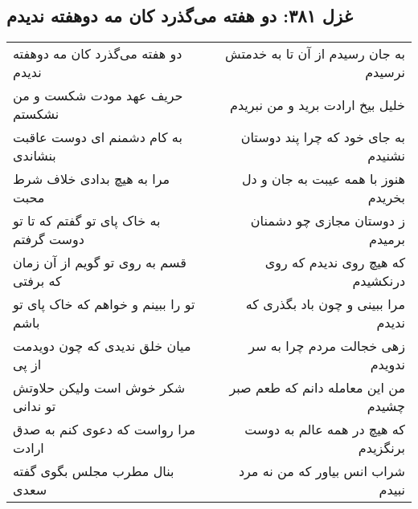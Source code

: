 \begin{center}
\section*{غزل ۳۸۱: دو هفته می‌گذرد کان مه دوهفته ندیدم}
\label{sec:381}
\begin{longtable}{l p{0.5cm} r}
دو هفته می‌گذرد کان مه دوهفته ندیدم
&&
به جان رسیدم از آن تا به خدمتش نرسیدم
\\
حریف عهد مودت شکست و من نشکستم
&&
خلیل بیخ ارادت برید و من نبریدم
\\
به کام دشمنم ای دوست عاقبت بنشاندی
&&
به جای خود که چرا پند دوستان نشنیدم
\\
مرا به هیچ بدادی خلاف شرط محبت
&&
هنوز با همه عیبت به جان و دل بخریدم
\\
به خاک پای تو گفتم که تا تو دوست گرفتم
&&
ز دوستان مجازی چو دشمنان برمیدم
\\
قسم به روی تو گویم از آن زمان که برفتی
&&
که هیچ روی ندیدم که روی درنکشیدم
\\
تو را ببینم و خواهم که خاک پای تو باشم
&&
مرا ببینی و چون باد بگذری که ندیدم
\\
میان خلق ندیدی که چون دویدمت از پی
&&
زهی خجالت مردم چرا به سر ندویدم
\\
شکر خوش است ولیکن حلاوتش تو ندانی
&&
من این معامله دانم که طعم صبر چشیدم
\\
مرا رواست که دعوی کنم به صدق ارادت
&&
که هیچ در همه عالم به دوست برنگزیدم
\\
بنال مطرب مجلس بگوی گفته سعدی
&&
شراب انس بیاور که من نه مرد نبیدم
\\
\end{longtable}
\end{center}
